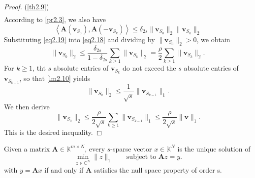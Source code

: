\begin{proof} {(\cref{th2.9})}
\begin{eqnarray}
        \label{eq2.18}
    \end{eqnarray}
    According to \cref{pr2.3}, we also have
    \begin{equation}
        \left<\mathbf{A}(\mathbf{v}_{S_0}), \mathbf{A}(-\mathbf{v}_{S_k})\right> \leq \delta_{2s} \|\mathbf{v}_{S_0}\|_2 \|\mathbf{v}_{S_k}\|_2
        \label{eq2.19}
    \end{equation}
    Substituting \cref{eq2.19} into \cref{eq2.18} and dividing by $\|\mathbf{v}_{S_0}\|_2 > 0$, we obtain
    \[
        \|\mathbf{v}_{S_0}\|_2 \leq \frac{\delta_{2s}}{1-\delta_{2s}} \sum\limits_{k \geq 1} \|\mathbf{v}_{S_k}\|_2 = \frac{\rho}{2} \sum\limits_{k \geq 1} \|\mathbf{v}_{S_k}\|_2.
    \]
    For $k \geq 1$, tht $s$ absolute entries of $\mathbf{v}_{S_k}$ do not exceed the $s$ absolute entries of $\mathbf{v}_{S_{k-1}}$, so that \cref{lm2.10} yields
    \[
        \|\mathbf{v}_{S_k}\|_2 \leq \frac{1}{\sqrt{s}} \|\mathbf{v}_{S_{k-1}}\|_1.
    \]
    We then derive
    \[
        \|\mathbf{v}_{S_0}\|_2 \leq \frac{\rho}{2 \sqrt{s}} \sum\limits_{k \geq 1} \|\mathbf{v}_{S_{k-1}}\|_1 \leq \frac{\rho}{2 \sqrt{s}} \|\mathbf{v}\|_1.
    \]
    This is the desired inequality.
\end{proof}

\begin{mdframed}
    \begin{theorem}
        \label{th4.5frombook}
        Given a matrix $\mathbf{A} \in \mathbb{K}^{m \times N}$, every $s$-sparse vector $x \in \mathbb{K}^N$ is the unique solution of 
        \[
            \min\limits_{z \in \mathbb{C}^N} \|z\|_1 \qquad \text{subject to } \mathbf{A}z = y.
        \]
        with $y = \mathbf{A}x$ if and only if $\mathbf{A}$ satisfies the null space property of order s.
    \end{theorem}
\end{mdframed}

